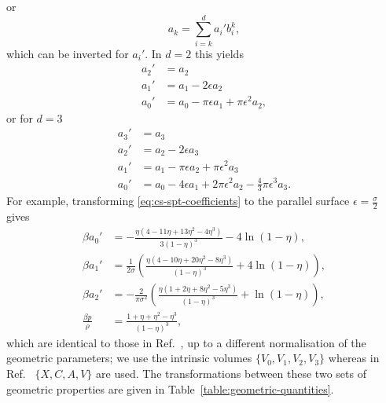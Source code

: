 or
\begin{equation}
  a_k = \sum_{i=k}^d a_i' b_i^k,
\end{equation}
which can be inverted for $a_i'$.
In $d=2$ this yields
\begin{subequations}
  \begin{align}
    a_2' &= a_2 \\
    a_1' &= a_1 - 2 \epsilon a_2 \\
    a_0' &= a_0 - \pi \epsilon a_1 + \pi \epsilon^2 a_2,
  \end{align}
\end{subequations}
or for $d=3$
\begin{subequations}
  \begin{align}
    a_3' &= a_3 \\
    a_2' &= a_2 - 2 \epsilon a_3 \\
    a_1' &= a_1 - \pi \epsilon a_2 + \pi \epsilon^2 a_3 \\
    a_0' &=
    a_0 - 4 \epsilon a_1 +
    2 \pi \epsilon^2 a_2 - \frac{4}{3} \pi \epsilon^3 a_3.
  \end{align}
\end{subequations}
For example, transforming \eqref{eq:cs-spt-coefficients} to the parallel surface $\epsilon = \frac{\sigma}{2}$ gives
\begin{subequations}\label{eq:cs-spt-coefficients-parallel}
  \begin{align}
    \beta a_0'
    &=
    - \frac{\eta(4 - 11\eta + 13\eta^2 - 4\eta^3)}{3(1-\eta)^3}
    - 4 \ln{(1-\eta)},
    \\
    \beta a_1'
    &=
    \frac{1}{2\sigma} \left(
    \frac{\eta(4 - 10\eta + 20\eta^2 - 8\eta^3)}{(1-\eta)^3}
    + 4 \ln{(1-\eta)}
    \right),
    \\
    \beta a_2'
    &=
    - \frac{2}{\pi \sigma^2}
    \left(
    \frac{\eta(1 + 2\eta + 8\eta^2 - 5\eta^3)}{(1-\eta)^3}
    + \ln{(1-\eta)}
    \right),
    \\
    \frac{\beta p}{\rho}
    &=
    \frac{1 + \eta + \eta^2 - \eta^3}{(1-\eta)^3},
  \end{align}
\end{subequations}
which are identical to those in Ref.\ \cite{Hansen-GoosJPCM2006}, up to a different normalisation of the geometric parameters; we use the intrinsic volumes $\{V_0, V_1, V_2, V_3\}$ whereas in Ref.\ \cite{Hansen-GoosJPCM2006} $\{X, C, A, V\}$ are used.
The transformations between these two sets of geometric properties are given in Table~\ref{table:geometric-quantities}.

